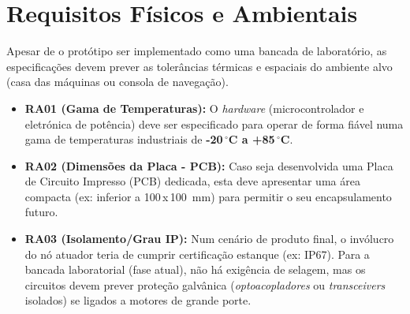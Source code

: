 \section{Requisitos Físicos e Ambientais}
Apesar de o protótipo ser implementado como uma bancada de laboratório, as especificações devem prever as tolerâncias térmicas e espaciais do ambiente alvo (casa das máquinas ou consola de navegação).
\begin{itemize}
    \item \textbf{RA01 (Gama de Temperaturas):} O \textit{hardware} (microcontrolador e eletrónica de potência) deve ser especificado para operar de forma fiável numa gama de temperaturas industriais de \textbf{-20\,$^{\circ}$C a +85\,$^{\circ}$C}.
    \item \textbf{RA02 (Dimensões da Placa - PCB):} Caso seja desenvolvida uma Placa de Circuito Impresso (PCB) dedicada, esta deve apresentar uma área compacta (ex: inferior a 100\,x\,100~mm) para permitir o seu encapsulamento futuro.
    \item \textbf{RA03 (Isolamento/Grau IP):} Num cenário de produto final, o invólucro do nó atuador teria de cumprir certificação estanque (ex: IP67). Para a bancada laboratorial (fase atual), não há exigência de selagem, mas os circuitos devem prever proteção galvânica (\textit{optoacopladores} ou \textit{transceivers} isolados) se ligados a motores de grande porte.
\end{itemize}
